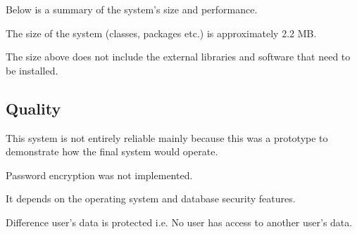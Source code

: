 \documentclass[10pt]{article}
\begin{document}
Below is a summary of the system’s size and performance.

\begin{description}[font=$\bullet$~\normalfont\scshape\color{red!50!black}]
\item[] The size of the system (classes, packages etc.) is approximately 2.2 MB.
\item[] The size above does not include the external libraries and software that need to be installed.
\end{description}


\subsection{Quality}

This system is not entirely reliable mainly because this was a prototype to demonstrate how the final system would operate. 

\begin{description}[font=$\bullet$~\normalfont\scshape\color{red!50!black}]
\item[] Password encryption was not implemented.
\item[] It depends on the operating system and database security features.
\item[] Difference user’s data is protected i.e. No user has access to another user’s data.
\end{description}
\end{document}
